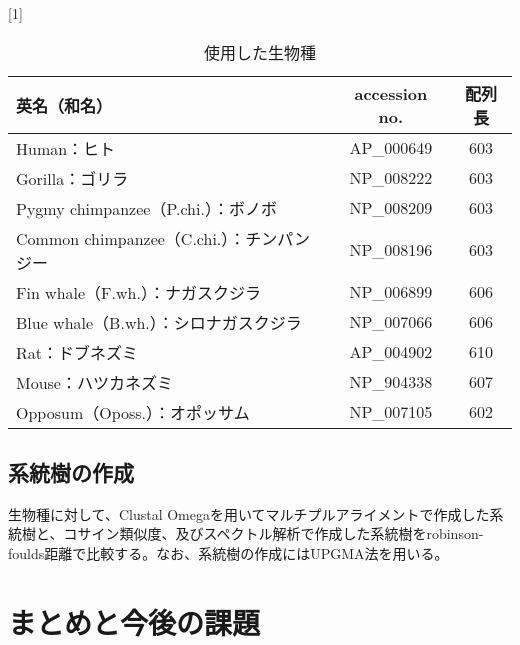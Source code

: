 \documentclass[twocolumn,paper=a4paper,landscape,fontsize=9pt]{jlreq}
\begin{document}
\begin{table}[h]
\centering
\caption{使用した生物種}
\scalebox{1}[1]{
\begin{tabular}{|l|c|c|} \hline
英名（和名）& accession no. & 配列長 \\ \hline
Human：ヒト & AP\_000649 & 603 \\[-2mm]
Gorilla：ゴリラ & NP\_008222 & 603 \\[-2mm]
Pygmy chimpanzee（P.chi.）：ボノボ & NP\_008209 & 603 \\[-2mm]
Common chimpanzee（C.chi.）：チンパンジー & NP\_008196 & 603 \\[-2mm]
Fin whale（F.wh.）：ナガスクジラ & NP\_006899 & 606 \\[-2mm]
Blue whale（B.wh.）：シロナガスクジラ & NP\_007066 & 606 \\[-2mm]
Rat：ドブネズミ & AP\_004902 & 610 \\[-2mm]
Mouse：ハツカネズミ  & NP\_904338 & 607 \\[-2mm]
Opposum（Oposs.）：オポッサム & NP\_007105 & 602 \\ \hline
\end{tabular}}
\end{table}

\subsection{系統樹の作成}
生物種に対して、Clustal Omegaを用いてマルチプルアライメントで作成した系統樹と、コサイン類似度、及びスペクトル解析で作成した系統樹をrobinson-foulds距離で比較する。なお、系統樹の作成にはUPGMA法を用いる。

\section{まとめと今後の課題}
\end{document}
